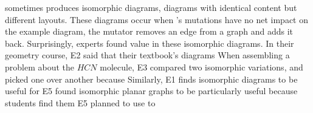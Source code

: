 



\Edgeworth sometimes produces isomorphic diagrams, \ie diagrams with identical content but different layouts. These diagrams occur when \Edgeworth's mutations have no net impact on the example diagram, \eg the mutator removes an edge from a graph and adds it back. Surprisingly, experts found value in these isomorphic diagrams. 
In their geometry course, E2 said that their textbook's diagrams  When assembling a problem about the $HCN$ molecule, E3 compared two isomorphic variations, and picked one over another because   Similarly, E1 finds isomorphic diagrams to be useful for  
E5 found isomorphic planar graphs to be particularly useful because students find them  E5 planned to use \Edgeworth to 






